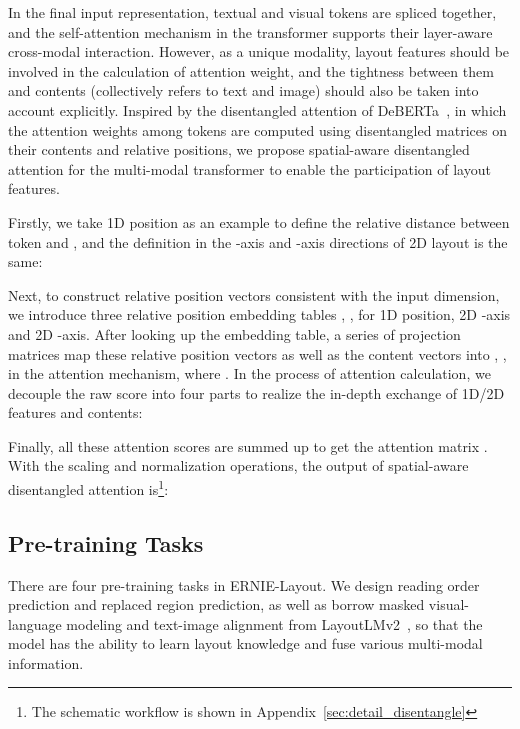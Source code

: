 \documentclass[11pt]{article}
\begin{document}
In the final input representation, textual and visual tokens are spliced together, and the self-attention mechanism in the transformer supports their layer-aware cross-modal interaction.
However, as a unique modality, layout features should be involved in the calculation of attention weight, and the tightness between them and contents (collectively refers to text and image) should also be taken into account explicitly.
Inspired by the disentangled attention of DeBERTa~\cite{he2021deberta}, in which the attention weights among tokens are computed using disentangled matrices on their contents and relative positions, we propose spatial-aware disentangled attention for the multi-modal transformer to enable the participation of layout features.

Firstly, we take 1D position as an example to define the relative distance  between token  and , and the definition in the -axis and -axis directions of 2D layout is the same:


Next, to construct relative position vectors consistent with the input dimension, we introduce three relative position embedding tables , ,  for 1D position, 2D -axis and 2D -axis.
After looking up the embedding table, a series of projection matrices map these relative position vectors as well as the content vectors into , ,  in the attention mechanism, where .
In the process of attention calculation, we decouple the raw score into four parts to realize the in-depth exchange of 1D/2D features and contents:


Finally, all these attention scores are summed up to get the attention matrix . With the scaling and normalization operations, the output of spatial-aware disentangled attention is\footnote{The schematic workflow is shown in
Appendix~\ref{sec:detail_disentangle}}:


\subsection{Pre-training Tasks}

There are four pre-training tasks in ERNIE-Layout.
We design reading order prediction and replaced region prediction, as well as borrow masked visual-language modeling and text-image alignment from LayoutLMv2~\cite{xu2021layoutlmv2}, so that the model has the ability to learn layout knowledge and fuse various multi-modal information.
\end{document}

